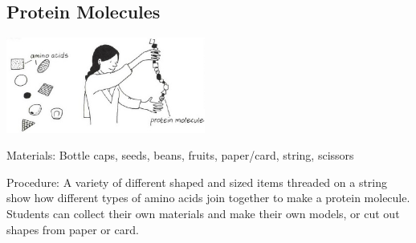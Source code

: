 \begin{multicols}{2}
\subsection{Protein Molecules}  %

\begin{center}
\includegraphics[width=0.49\textwidth]{./img/vso/proteins.jpg}
\end{center}

\begin{description*}
\item[Materials:]{Bottle caps, seeds, beans, fruits, paper/card, string, scissors}
\item[Procedure:]{A variety of different shaped and
sized items threaded on a string
show how different types of
amino acids join together to
make a protein molecule.
Students can collect their own
materials and make their own
models, or cut out
shapes from paper or card.}
\end{description*}


\end{multicols}
